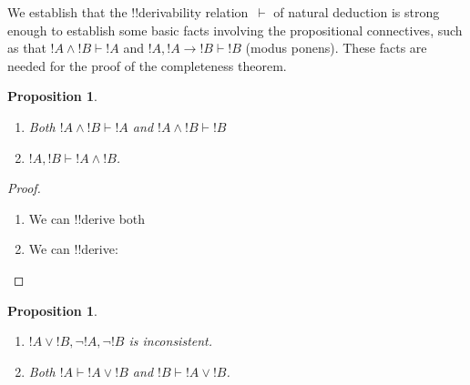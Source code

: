 \documentclass[10pt,a4paper]{article}
\theoremstyle{plain}
\newtheorem{prop}[thm]{Proposition}
\theoremstyle{definition}
\theoremstyle{remark}
\newenvironment{explain}{}{}
\newcommand*{\ollabel}[1]{\label{#1}}
\providecommand{\AxiomC}[1]{}
\providecommand{\UnaryInfC}[1]{}
\providecommand{\BinaryInfC}[1]{}
\providecommand{\RightLabel}[1]{}
\providecommand{\DisplayProof}{}
\newenvironment{prooftree}{}{}
\providecommand{\lif}{\mathbin{\rightarrow}}
\providecommand{\Proves}{\mathrel{\vdash}}
\providecommand{\Elim}[1]{}
\providecommand{\Intro}[1]{}
\providecommand{\Intro}{\mathrm{I}}
\providecommand{\bottomAlignProof}{\relax}
\providecommand{\bottomAlignProof}{\relax}
\begin{document}
\begin{explain}
  We establish that the !!{derivability} relation~$\Proves$ of natural
 deduction is strong enough to establish some basic facts
  involving the propositional connectives, such as that $!A \land !B
  \Proves !A$ and $!A, !A \lif !B \Proves !B$ (modus ponens). These
  facts are needed for the proof of the completeness theorem.
\end{explain}

\begin{prop}\ollabel{prop:provability-land}
  \begin{enumerate}
  \item \ollabel{prop:provability-land-left} Both $!A \land !B \Proves
    !A$ and $!A \land !B \Proves !B$
  \item \ollabel{prop:provability-land-right} $!A, !B \Proves !A \land !B$.
  \end{enumerate}
\end{prop}

\begin{proof}
  \begin{enumerate}
  \item We can !!{derive} both
    \begin{prooftree}
      \AxiomC{$!A \land !B$}
      \RightLabel{\Elim{\land}}
      \UnaryInfC{$!A$}
      \DisplayProof\qquad\bottomAlignProof
      \AxiomC{$!A \land !B$}
      \RightLabel{\Elim{\land}}
      \UnaryInfC{$!B$}
    \end{prooftree}
  \item We can !!{derive}:
    \begin{prooftree}
      \AxiomC{$!A$}
      \AxiomC{$!B$}
      \RightLabel{\Intro{\land}}
      \BinaryInfC{$!A \land !B$}
    \end{prooftree}
  \end{enumerate}
\end{proof}


\begin{prop}\ollabel{prop:provability-lor}
  \begin{enumerate}
  \item $!A \lor !B, \lnot !A, \lnot !B$ is inconsistent.
  \item Both $!A \Proves !A \lor !B$ and $!B \Proves !A \lor !B$.
  \end{enumerate}
\end{prop}
\end{document}
